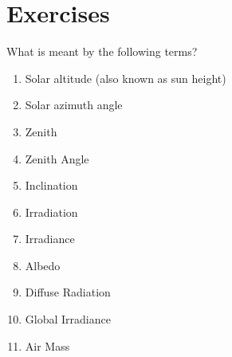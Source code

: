 \documentclass[class=scrartcl, crop=false,parskip=half]{standalone}
\begin{document}
\section{Exercises} %
\begin{question}\label{qu:ex1}
What is meant by the following terms?
    \begin{enumerate}[label=\alph*)]
        \item Solar altitude (also known as sun height)
        \item Solar azimuth angle
        \item Zenith
        \item Zenith Angle
        \item Inclination
        \item Irradiation
        \item Irradiance
        \item Albedo 
        \item Diffuse Radiation
        \item Global Irradiance
        \item Air Mass
    \end{enumerate}
\end{question}
\end{document}
